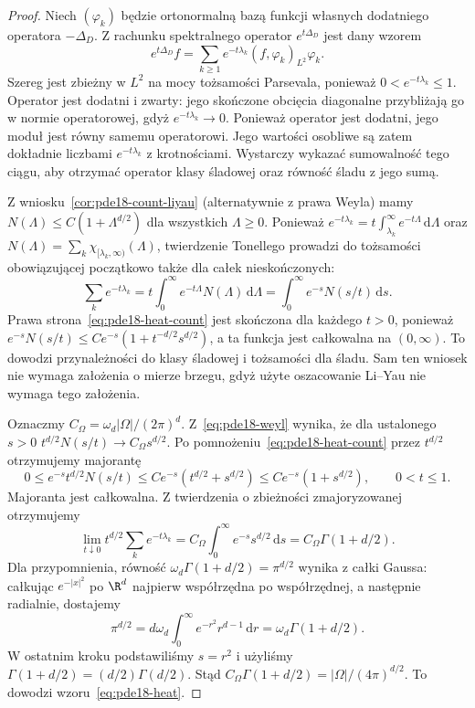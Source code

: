 \begin{proof}
Niech $(\varphi_k)$ będzie ortonormalną bazą funkcji
własnych dodatniego operatora $-\Delta_D$.
Z rachunku spektralnego operator $e^{t\Delta_D}$ jest
dany wzorem
\[
 e^{t\Delta_D}f=\sum_{k\ge1}e^{-t\lambda_k}
 (f,\varphi_k)_{L^2}\varphi_k.
\]
Szereg jest zbieżny w $L^2$ na mocy tożsamości
Parsevala, ponieważ $0<e^{-t\lambda_k}\le1$.
Operator jest dodatni i zwarty: jego skończone obcięcia
diagonalne przybliżają go w normie operatorowej, gdyż
$e^{-t\lambda_k}\to0$.
Ponieważ operator jest dodatni, jego moduł jest równy
samemu operatorowi. Jego wartości osobliwe są zatem
dokładnie liczbami
$e^{-t\lambda_k}$ z krotnościami. Wystarczy wykazać
sumowalność tego ciągu, aby otrzymać operator klasy
śladowej oraz równość śladu z jego sumą.

Z wniosku~\ref{cor:pde18-count-liyau} (alternatywnie z prawa
Weyla) mamy $N(\Lambda)\le C(1+\Lambda^{d/2})$
dla wszystkich $\Lambda\ge0$. Ponieważ
$e^{-t\lambda_k}=t\int_{\lambda_k}^\infty
e^{-t\Lambda}\,\mathrm d\Lambda$ oraz
$N(\Lambda)=\sum_k\chi_{[\lambda_k,\infty)}(\Lambda)$,
twierdzenie Tonellego prowadzi do tożsamości
obowiązującej początkowo także dla całek nieskończonych:
\begin{equation}\label{eq:pde18-heat-count}
 \sum_ke^{-t\lambda_k}=t\int_0^\infty e^{-t\Lambda}
 N(\Lambda)\,\mathrm d\Lambda
 =\int_0^\infty e^{-s}N(s/t)\,\mathrm ds.
\end{equation}
Prawa strona~\eqref{eq:pde18-heat-count} jest skończona
dla każdego $t>0$, ponieważ
$e^{-s}N(s/t)\le C e^{-s}(1+t^{-d/2}s^{d/2})$,
a ta funkcja jest całkowalna na $(0,\infty)$.
To dowodzi przynależności do klasy śladowej i tożsamości dla śladu.
Sam ten wniosek nie wymaga założenia o mierze brzegu,
gdyż użyte oszacowanie Li--Yau nie wymaga tego założenia.

Oznaczmy $C_\Omega=\omega_d|\Omega|/(2\pi)^d$.
Z~\eqref{eq:pde18-weyl} wynika, że dla ustalonego $s>0$
$t^{d/2}N(s/t)\to C_\Omega s^{d/2}$.
Po pomnożeniu~\eqref{eq:pde18-heat-count} przez
$t^{d/2}$ otrzymujemy majorantę
\[
 0\le e^{-s}t^{d/2}N(s/t)
 \le C e^{-s}(t^{d/2}+s^{d/2})
 \le C e^{-s}(1+s^{d/2}),\qquad 0<t\le1.
\]
Majoranta jest całkowalna. Z twierdzenia o zbieżności
zmajoryzowanej otrzymujemy
\[
 \lim_{t\downarrow0}t^{d/2}\sum_ke^{-t\lambda_k}
 =C_\Omega\int_0^\infty e^{-s}s^{d/2}\,\mathrm ds
 =C_\Omega\Gamma(1+d/2).
\]
Dla przypomnienia, równość
$\omega_d\Gamma(1+d/2)=\pi^{d/2}$ wynika z całki
Gaussa: całkując $e^{-|x|^2}$ po $\R^d$ najpierw
współrzędna po współrzędnej, a następnie radialnie,
dostajemy
\[
 \pi^{d/2}=d\omega_d\int_0^\infty e^{-r^2}r^{d-1}
 \,\mathrm dr
 =\omega_d\Gamma(1+d/2).
\]
W ostatnim kroku podstawiliśmy $s=r^2$ i użyliśmy
$\Gamma(1+d/2)=(d/2)\Gamma(d/2)$.
Stąd $C_\Omega\Gamma(1+d/2)=|\Omega|/(4\pi)^{d/2}$.
To dowodzi wzoru~\eqref{eq:pde18-heat}.
\end{proof}

